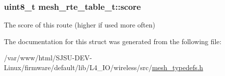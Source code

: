 \subsubsection[{\texorpdfstring{score}{score}}]{\setlength{\rightskip}{0pt plus 5cm}uint8\+\_\+t mesh\+\_\+rte\+\_\+table\+\_\+t\+::score}\hypertarget{structmesh__rte__table__t_a0c297bfd5cce3d28e80e71d8757f009a}{}\label{structmesh__rte__table__t_a0c297bfd5cce3d28e80e71d8757f009a}


The score of this route (higher if used more often) 



The documentation for this struct was generated from the following file\+:\begin{DoxyCompactItemize}
\item 
/var/www/html/\+S\+J\+S\+U-\/\+D\+E\+V-\/\+Linux/firmware/default/lib/\+L4\+\_\+\+I\+O/wireless/src/\hyperlink{mesh__typedefs_8h}{mesh\+\_\+typedefs.\+h}\end{DoxyCompactItemize}
